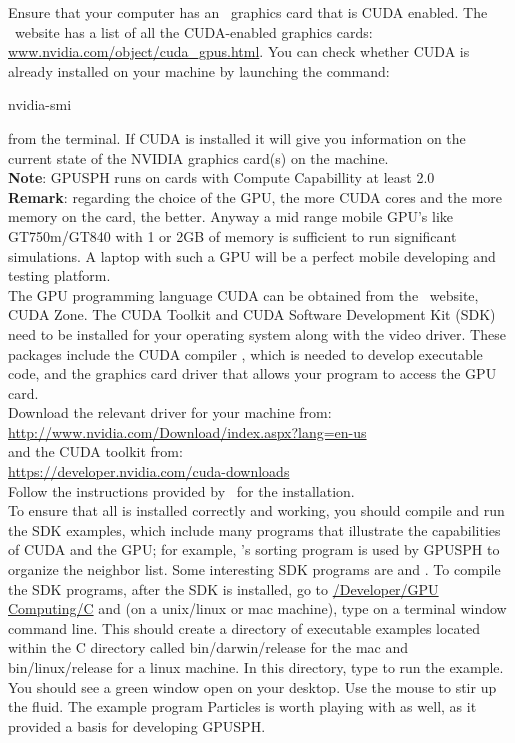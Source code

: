 \documentclass{../GPUSPHtemplate}
\begin{document}
Ensure that your computer has an \nvidia\ graphics card that is CUDA
enabled. The \nvidia\ website has a list of all the CUDA-enabled graphics
cards: \url{www.nvidia.com/object/cuda_gpus.html}. You can check whether
CUDA is already installed on your machine by launching the command:
\begin{shellcode}
nvidia-smi
\end{shellcode}
from the terminal. If CUDA is installed it will give you information
on the current state of the NVIDIA graphics card(s) on the machine.\\

\textbf{Note}: GPUSPH runs on cards with Compute Capabillity at least 2.0
\\

\textbf{Remark}: regarding the choice of the GPU, the more CUDA 
cores and the more memory on the card, the better. Anyway a
mid range mobile GPU's like GT750m/GT840 with 1 or 2GB of memory
is sufficient to run significant simulations. A laptop with such a GPU will be
a perfect mobile developing and testing platform.\\

The GPU programming language CUDA can be obtained from the \nvidia\ website,
CUDA Zone. The CUDA Toolkit and CUDA Software Development Kit (SDK)
need to be installed for your operating system along with the video
driver. These packages include the CUDA compiler , which is
needed to develop executable code, and the graphics card driver that
allows your program to access the GPU card. \\

Download the relevant driver for your machine from:\\
\url{http://www.nvidia.com/Download/index.aspx?lang=en-us} \\
and the CUDA toolkit from:\\
\url{https://developer.nvidia.com/cuda-downloads}\\
Follow the instructions provided by \nvidia\ for the installation.\\


To ensure that all is installed correctly and working, you should
compile and run the SDK examples, which include many programs that
illustrate the capabilities of CUDA and the GPU; for example, \nvidia's
sorting program  is used by GPUSPH to organize the
neighbor list. Some interesting SDK programs are  and
. To compile the SDK programs, after the SDK is
installed, go to \url{/Developer/GPU Computing/C} and (on a unix/linux
or mac machine), type  on a terminal window command line. This
should create a directory of executable examples located within the C
directory called bin/darwin/release for the mac and bin/linux/release
for a linux machine. In this directory, type  to run
the  example. You should see a green window open on your
desktop. Use the mouse to stir up the fluid. The example program
Particles is worth playing with as well, as it provided a basis for
developing GPUSPH.\\
\end{document}
